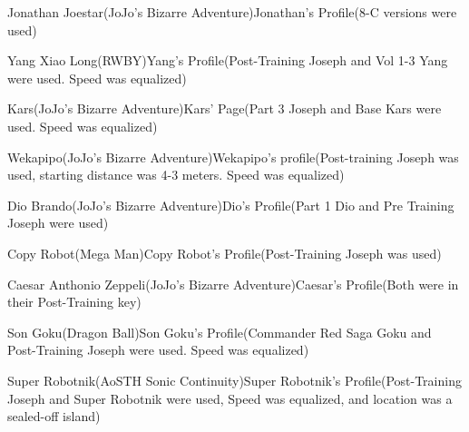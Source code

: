 \documentclass[a4paper,12pt]{article}
\begin{document}
Jonathan Joestar(JoJo's Bizarre Adventure)Jonathan's Profile(8-C versions were used)\\ \par \vspace{0.5cm}

Yang Xiao Long(RWBY)Yang's Profile(Post-Training Joseph and Vol 1-3 Yang were used. Speed was equalized)\\ \par \vspace{0.5cm}

Kars(JoJo's Bizarre Adventure)Kars' Page(Part 3 Joseph and Base Kars were used. Speed was equalized)\\ \par \vspace{0.5cm}

Wekapipo(JoJo's Bizarre Adventure)Wekapipo's profile(Post-training Joseph was used, starting distance was 4-3 meters. Speed was equalized)\\ \par \vspace{0.5cm}

Dio Brando(JoJo's Bizarre Adventure)Dio's Profile(Part 1 Dio and Pre Training Joseph were used)\\ \par \vspace{0.5cm}

Copy Robot(Mega Man)Copy Robot's Profile(Post-Training Joseph was used)\\ \par \vspace{0.5cm}

Caesar Anthonio Zeppeli(JoJo's Bizarre Adventure)Caesar's Profile(Both were in their Post-Training key)\\ \par \vspace{0.5cm}

Son Goku(Dragon Ball)Son Goku's Profile(Commander Red Saga Goku and Post-Training Joseph were used. Speed was equalized)\\ \par \vspace{0.5cm}

Super Robotnik(AoSTH Sonic Continuity)Super Robotnik's Profile(Post-Training Joseph and Super Robotnik were used, Speed was equalized, and location was a sealed-off island)\\ \par \vspace{0.5cm}
\end{document}
